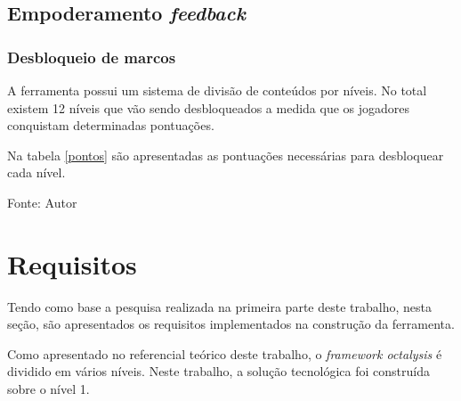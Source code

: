  \subsection{Empoderamento \textit{feedback}}
	 \subsubsection{Desbloqueio de marcos}
	A ferramenta possui um sistema de divisão de conteúdos por níveis. No total existem 12 níveis que vão sendo desbloqueados a medida que os jogadores conquistam determinadas pontuações.

	Na tabela \ref{pontos} são apresentadas as pontuações necessárias para desbloquear cada nível.


\begin{table}[h]
	\centering
	\caption{Pontuações}
	\label{pontos}
	Fonte: Autor
\end{table}

\section{Requisitos}

Tendo como base a pesquisa realizada na primeira parte deste trabalho, nesta seção, são apresentados os requisitos implementados na construção da 
ferramenta.

Como apresentado no referencial teórico deste trabalho, o \textit{framework octalysis} é dividido em vários níveis. Neste trabalho, a solução tecnológica
foi construída sobre o nível 1.

